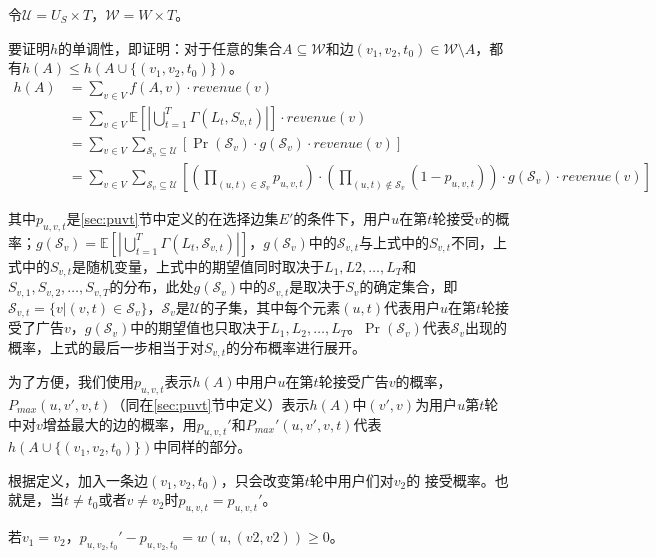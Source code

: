 令$\mathcal{U}=U_S \times T$，$\mathcal{W}=W \times T$。

要证明$h$的单调性，即证明：对于任意的集合$A \subseteq \mathcal{W}$和边$(v_1,v_2,t_0) \in \mathcal{W}\setminus A$，都有$h(A)\le h(A\cup\{(v_1,v_2,t_0)\})$。
\begin{align}
    h(A)&=\sum_{v \in V} f(A,v)\cdot revenue(v) \\ 
    &=\sum_{v \in V} \mathbb{E}\left[\left|\bigcup_{t=1}^{T}\Gamma(L_t,S_{v,t})\right|\right]\cdot revenue(v) \\
    &= \sum_{v\in V} \sum_{\mathcal{S}_v \subseteq \mathcal{U}} \left[\Pr(\mathcal{S}_v)\cdot g(\mathcal{S}_v)\cdot revenue(v)\right]\\ 
    &=\sum_{v\in V}\sum_{\mathcal{S}_v \subseteq \mathcal{U}}\left[\left(\prod_{(u,t)\in \mathcal{S}_v}p_{u,v,t}\right)\cdot \left(\prod_{(u,t) \notin \mathcal{S}_v} (1-p_{u,v,t})\right) \cdot g(\mathcal{S}_v)\cdot revenue(v)\right]     
\end{align}

\noindent 其中$p_{u,v,t}$是\ref{sec:puvt}节中定义的在选择边集$E'$的条件下，用户$u$在第$t$轮接受$v$的概率；$g(\mathcal{S}_v)=\mathbb{E}\left[\left|\bigcup_{t=1}^{T}\Gamma(L_t,\mathcal{S}_{v,t})\right|\right] $，$g(\mathcal{S}_v)$中的$\mathcal{S}_{v,t}$与上式中的$S_{v,t}$不同，上式中的$S_{v,t}$是随机变量，上式中的期望值同时取决于$L_1,L2,\ldots,L_T$和$S_{v,1},S_{v,2},\ldots,S_{v,T}$的分布，此处$g(\mathcal{S}_v)$中的$\mathcal{S}_{v,t}$是取决于$S_v$的确定集合，即$\mathcal{S}_{v,t}=\{v|(v,t)\in \mathcal{S}_v\}$，$\mathcal{S}_v$是$\mathcal{U}$的子集，其中每个元素$(u,t)$代表用户$u$在第$t$轮接受了广告$v$，$g(\mathcal{S}_v)$中的期望值也只取决于$L_1,L_2,\ldots,L_T$。$\Pr(\mathcal{S}_v)$代表$\mathcal{S}_v$出现的概率，上式的最后一步相当于对$S_{v,t}$的分布概率进行展开。

为了方便，我们使用$p_{u,v,t}$表示$h(A)$中用户$u$在第$t$轮接受广告$v$的概率， $P_{max}(u,v',v,t)$（同在\ref{sec:puvt}节中定义）表示$h(A)$中$(v',v)$为用户$u$第$t$轮中对$v$增益最大的边的概率，用$p_{u,v,t}'$和$P_{max}'(u,v',v,t)$代表$h(A\cup\{(v_1,v_2,t_0)\})$中同样的部分。

根据定义，加入一条边$(v_1,v_2,t_0)$，只会改变第$t$轮中用户们对$v_2$的 接受概率。也就是，当$t\ne t_0$或者$v \ne v_2$时$p_{u,v,t}=p_{u,v,t}'$。

若$v_1 = v_2$，$p_{u,v_2,t_0}'-p_{u,v_2,t_0}=w(u,(v2,v2)) \ge 0$。

